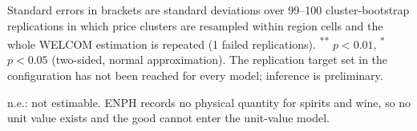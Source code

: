 \documentclass[
  11pt,
]{article}
\begin{document}
\begin{table}[!htbp]
\begin{threeparttable}
\begin{tablenotes}[flushleft]
\item Standard errors in brackets are standard deviations over 99--100 cluster-bootstrap replications in which price clusters are resampled within region cells and the whole WELCOM estimation is repeated (1 failed replications). \textsuperscript{**} $p<0.01$, \textsuperscript{*} $p<0.05$ (two-sided, normal approximation). The replication target set in the configuration has not been reached for every model; inference is preliminary.
\item n.e.: not estimable. ENPH records no physical quantity for spirits and wine, so no unit value exists and the good cannot enter the unit-value model.
\end{tablenotes}
\end{threeparttable}
\end{table}

\clearpage
\end{document}
